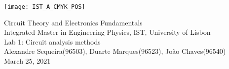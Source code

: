 \thispagestyle {empty}

\texttt{[image: IST\_A\_CMYK\_POS]}

\begin{center}

\vspace{1.0cm}

\vspace{1cm}
{\FontLb Circuit Theory and Electronics Fundamentals} \\ %
\vspace{0.5cm}
{\FontSn Integrated Master in Engineering Physics, IST, University of Lisbon} \\
\vspace{0.5cm}
{\FontSn Lab 1: Circuit analysis methods} \\
\vspace{0.2cm}
{\FontSn Alexandre Sequeira(96503), Duarte Marques(96523), João Chaves(96540)} \\
\vspace{0.2cm}
{\FontSn March 25, 2021} \\ %
%
\end{center}

